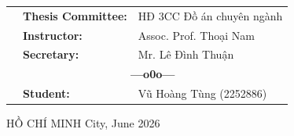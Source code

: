\documentclass[12pt, a4paper]{report}
\theoremstyle{definition}
\begin{document}
\begin{titlepage}
\begin{tabular}{p{2.5cm} l l}
    & \textbf{\Large Thesis Committee:} & {\Large HĐ 3CC Đồ án chuyên ngành} \\[0.4cm]
    & \textbf{\Large Instructor:}       & {\Large Assoc. Prof. Thoại Nam} \\[0.4cm]
    & \textbf{\Large Secretary:}        & {\Large Mr. Lê Đình Thuận} \\[0.4cm]
    & \multicolumn{2}{c}{\textbf{\Large ---o0o---}} \\[0.4cm]
    & \textbf{\Large Student:}          & {\Large Vũ Hoàng Tùng (2252886)} \\
\end{tabular}
\vspace{0.5cm}
\begin{center}
{\Large HỒ CHÍ MINH City, June 2026 }
\end{center}
\end{titlepage}
\newpage



\newpage
\tableofcontents
\newpage
\listoffigures
\newpage
\listoftables
\newpage
\setcounter{page}{1}


\newpage

\newpage

\newpage

\newpage

\newpage

\newpage

\newpage


\nocite{*}


\end{document}
